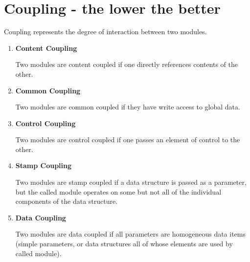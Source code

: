 \documentclass[11pt]{article}
\begin{document}
\section*{Coupling - the lower the better}

Coupling represents the degree of interaction between two modules.

\begin{enumerate}
	\item \textbf{Content Coupling}
	
	Two modules are content coupled if one directly references contents of the other.

	\item \textbf{Common Coupling}
	
	Two modules are common coupled if they have write access to global data.
	
	\item \textbf{Control Coupling}
	
	Two modules are control coupled if one passes an element of control to the other.
	
	\item \textbf{Stamp Coupling}
	
	Two modules are stamp coupled if a data structure is passed as a parameter, but the called module operates on some but not all of the individual components of the data structure.

	\item \textbf{Data Coupling}
	
	Two modules are data coupled if all parameters are homogeneous data items (simple parameters, or data structures all of whose elements are used by called module).
	
\end{enumerate}
\end{document}
